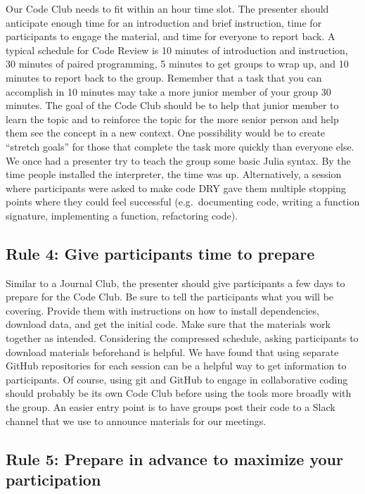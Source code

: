 \documentclass[
  11pt,
]{article}
\begin{document}
Our Code Club needs to fit within an hour time slot. The presenter
should anticipate enough time for an introduction and brief instruction,
time for participants to engage the material, and time for everyone to
report back. A typical schedule for Code Review is 10 minutes of
introduction and instruction, 30 minutes of paired programming, 5
minutes to get groups to wrap up, and 10 minutes to report back to the
group. Remember that a task that you can accomplish in 10 minutes may
take a more junior member of your group 30 minutes. The goal of the Code
Club should be to help that junior member to learn the topic and to
reinforce the topic for the more senior person and help them see the
concept in a new context. One possibility would be to create ``stretch
goals'' for those that complete the task more quickly than everyone
else. We once had a presenter try to teach the group some basic Julia
syntax. By the time people installed the interpreter, the time was up.
Alternatively, a session where participants were asked to make code DRY
gave them multiple stopping points where they could feel successful
(e.g.~documenting code, writing a function signature, implementing a
function, refactoring code).

\hypertarget{rule-4-give-participants-time-to-prepare}{%
\subsection{Rule 4: Give participants time to
prepare}\label{rule-4-give-participants-time-to-prepare}}

Similar to a Journal Club, the presenter should give participants a few
days to prepare for the Code Club. Be sure to tell the participants what
you will be covering. Provide them with instructions on how to install
dependencies, download data, and get the initial code. Make sure that
the materials work together as intended. Considering the compressed
schedule, asking participants to download materials beforehand is
helpful. We have found that using separate GitHub repositories for each
session can be a helpful way to get information to participants. Of
course, using git and GitHub to engage in collaborative coding should
probably be its own Code Club before using the tools more broadly with
the group. An easier entry point is to have groups post their code to a
Slack channel that we use to announce materials for our meetings.

\hypertarget{rule-5-prepare-in-advance-to-maximize-your-participation}{%
\subsection{Rule 5: Prepare in advance to maximize your
participation}\label{rule-5-prepare-in-advance-to-maximize-your-participation}}
\end{document}
